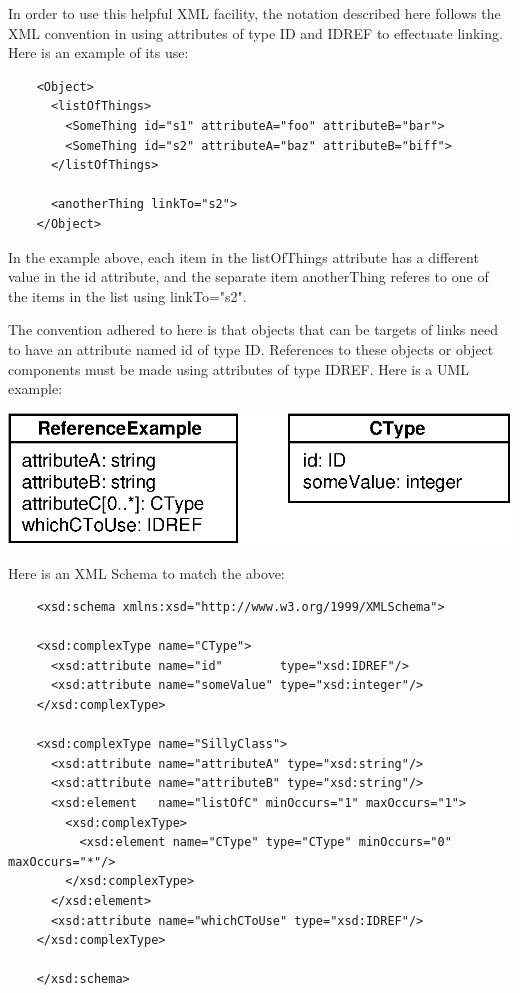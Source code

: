 \documentclass[10pt]{article}
\newcommand{\tightspacing}{\renewcommand{\baselinestretch}{0.85}}
\newcommand{\regularspacing}{\renewcommand{\baselinestretch}{1.0}}
\newcommand{\class}[1]{\textsf{#1}}
\newcommand{\attrib}[1]{\textsf{#1}}
\begin{document}
In order to use this helpful XML facility, the notation described here
follows the XML convention in using attributes of type \class{ID} and
\class{IDREF} to effectuate linking.  Here is an example of its use:
\begin{small}
  \tightspacing
\begin{verbatim}
    <Object>
      <listOfThings>
        <SomeThing id="s1" attributeA="foo" attributeB="bar">
        <SomeThing id="s2" attributeA="baz" attributeB="biff">
      </listOfThings>

      <anotherThing linkTo="s2">
    </Object>
\end{verbatim}
  \regularspacing
\end{small}
In the example above, each item in the \attrib{listOfThings} attribute has
a different value in the \attrib{id} attribute, and the separate item
\attrib{anotherThing} referes to one of the items in the list using
\attrib{linkTo="s2"}.

The convention adhered to here is that objects that can be targets of links
need to have an attribute named \class{id} of type \class{ID}.  References
to these objects or object components must be made using attributes of type
\class{IDREF}.  Here is a UML example:
\begin{center}
  \includegraphics[scale = 0.7]{id-example.eps}
\end{center}
Here is an XML Schema to match the above:
\begin{small}
  \tightspacing
\begin{verbatim}
    <xsd:schema xmlns:xsd="http://www.w3.org/1999/XMLSchema">
    
    <xsd:complexType name="CType">
      <xsd:attribute name="id"        type="xsd:IDREF"/>
      <xsd:attribute name="someValue" type="xsd:integer"/>
    </xsd:complexType>

    <xsd:complexType name="SillyClass">
      <xsd:attribute name="attributeA" type="xsd:string"/>
      <xsd:attribute name="attributeB" type="xsd:string"/>
      <xsd:element   name="listOfC" minOccurs="1" maxOccurs="1">
        <xsd:complexType>
          <xsd:element name="CType" type="CType" minOccurs="0" maxOccurs="*"/>
        </xsd:complexType>
      </xsd:element>
      <xsd:attribute name="whichCToUse" type="xsd:IDREF"/>
    </xsd:complexType>

    </xsd:schema>
\end{verbatim}
  \regularspacing
\end{small}
\end{document}
